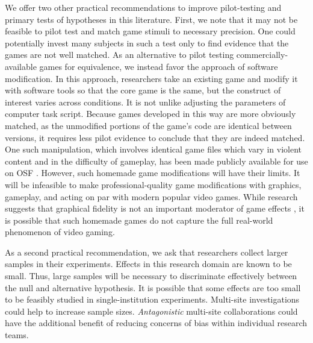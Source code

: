 \documentclass[fignum,nobf,man]{apa}
\begin{document}
We offer two other practical recommendations to improve pilot-testing and primary tests of hypotheses in this literature. First, we note that it may not be feasible to pilot test and match game stimuli to necessary precision. One could potentially invest many subjects in such a test only to find evidence that the games are not well matched. As an alternative to pilot testing commercially-available games for equivalence, we instead favor the approach of software modification. In this approach, researchers take an existing game and modify it with software tools so that the core game is the same, but the construct of interest varies across conditions. It is not unlike adjusting the parameters of computer task script. Because games developed in this way are more obviously matched, as the unmodified portions of the game's code are identical between versions, it requires less pilot evidence to conclude that they are indeed matched. One such manipulation, which involves identical game files which vary in violent content and in the difficulty of gameplay, has been made publicly available for use on OSF \citep{Hilgard:2014}. However, such homemade game modifications will have their limits. It will be infeasible to make professional-quality game modifications with graphics, gameplay, and acting on par with modern popular video games. While research suggests that graphical fidelity is not an important moderator of game effects \citep{Ivory:Kalyanaraman:2007}, it is possible that such homemade games do not capture the full real-world phenomenon of video gaming.

As a second practical recommendation, we ask that researchers collect larger samples in their experiments. Effects in this research domain are known to be small. Thus, large samples will be necessary to discriminate effectively between the null and alternative hypothesis. It is possible that some effects are too small to be feasibly studied in single-institution experiments. Multi-site investigations could help to increase sample sizes. {\em Antagonistic} multi-site collaborations could have the additional benefit of reducing concerns of bias %
within individual research teams. %
\end{document}
